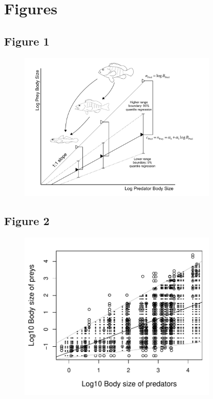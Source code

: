 \documentclass[12pt]{article}
\begin{document}
\newpage
\section*{Figures}

\subsection*{Figure 1}

\begin{figure}[ht!]
	\centering\includegraphics[width=0.85\textwidth]{Schema_niche_allometric.pdf}
\end{figure}

\newpage
\subsection*{Figure 2}

\begin{figure}[ht!]
	\centering\includegraphics[width=0.85\textwidth]{Example.pdf}
\end{figure}
\end{document}
